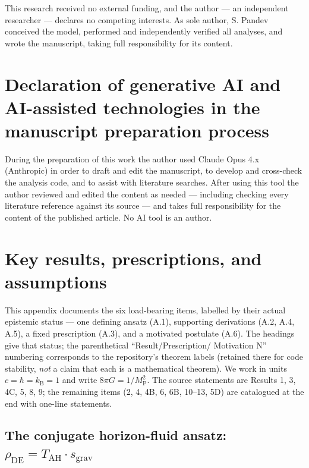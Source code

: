 \documentclass[preprint,12pt]{elsarticle}
\begin{document}
This research received no external funding, and the author --- an
independent researcher --- declares no competing interests. As sole
author, S. Pandev conceived the model, performed and independently
verified all analyses, and wrote the manuscript, taking full
responsibility for its content.

\section{Declaration of generative AI and AI-assisted technologies in
the manuscript preparation
process}\label{declaration-of-generative-ai-and-ai-assisted-technologies-in-the-manuscript-preparation-process}

During the preparation of this work the author used Claude Opus 4.x
(Anthropic) in order to draft and edit the manuscript, to develop and
cross-check the analysis code, and to assist with literature searches.
After using this tool the author reviewed and edited the content as
needed --- including checking every literature reference against its
source --- and takes full responsibility for the content of the
published article. No AI tool is an author.

\appendix

\section{Key results, prescriptions, and assumptions}\label{sec-A}

This appendix documents the six load-bearing items, labelled by their
actual epistemic status --- one defining ansatz (A.1), supporting
derivations (A.2, A.4, A.5), a fixed prescription (A.3), and a motivated
postulate (A.6). The headings give that status; the parenthetical
``Result/Prescription/ Motivation N'' numbering corresponds to the
repository's theorem labels (retained there for code stability,
\emph{not} a claim that each is a mathematical theorem). We work in
units \(c = \hbar  = k_{\mathrm{B}} = 1\) and write
\(8\pi G = 1/M_{\mathrm{P}}^{2}\). The source statements are Results 1,
3, 4C, 5, 8, 9; the remaining items (2, 4, 4B, 6, 6B, 10--13, 5D) are
catalogued at the end with one-line statements.

\subsection{\texorpdfstring{The conjugate horizon-fluid ansatz:
\(\rho _\mathrm{DE} = T_\mathrm{AH}\cdot s_{\mathrm{grav}}\)}{The conjugate horizon-fluid ansatz: \textbackslash rho \_\textbackslash mathrm\{DE\} = T\_\textbackslash mathrm\{AH\}\textbackslash cdot s\_\{\textbackslash mathrm\{grav\}\}}}\label{sec-A-1}
\end{document}

